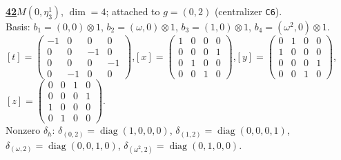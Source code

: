 \begin{samepage}\noindent\textbf{\underline{42}}\quad $M(0,\eta^{1}_{3})$, $\dim=4$; attached to $g=(0,2)$ (centralizer \texttt{C6}).\\
Basis: $b_{1}=(0,0)\otimes 1$, $b_{2}=(\omega,0)\otimes 1$, $b_{3}=(1,0)\otimes 1$, $b_{4}=(\omega^2,0)\otimes 1$.\\
$[t]=\left(\begin{smallmatrix} -1 & 0 & 0 & 0 \\ 0 & 0 & -1 & 0 \\ 0 & 0 & 0 & -1 \\ 0 & -1 & 0 & 0 \end{smallmatrix}\right)$,\quad $[x]=\left(\begin{smallmatrix} 1 & 0 & 0 & 0 \\ 0 & 0 & 0 & 1 \\ 0 & 1 & 0 & 0 \\ 0 & 0 & 1 & 0 \end{smallmatrix}\right)$,\quad $[y]=\left(\begin{smallmatrix} 0 & 1 & 0 & 0 \\ 1 & 0 & 0 & 0 \\ 0 & 0 & 0 & 1 \\ 0 & 0 & 1 & 0 \end{smallmatrix}\right)$,\quad $[z]=\left(\begin{smallmatrix} 0 & 0 & 1 & 0 \\ 0 & 0 & 0 & 1 \\ 1 & 0 & 0 & 0 \\ 0 & 1 & 0 & 0 \end{smallmatrix}\right)$.\\
Nonzero $\delta_h$: $\delta_{(0,2)}=\operatorname{diag}(1,0,0,0)$, $\delta_{(1,2)}=\operatorname{diag}(0,0,0,1)$, $\delta_{(\omega,2)}=\operatorname{diag}(0,0,1,0)$, $\delta_{(\omega^2,2)}=\operatorname{diag}(0,1,0,0)$.\end{samepage}
\medskip

